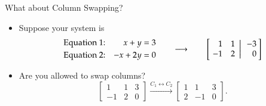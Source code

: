 \documentclass[10pt]{beamer}
\begin{document}
\begin{frame}{What about Column Swapping?}
\begin{itemize}
    \item Suppose your system is 
$$
        \begin{aligned}
        &\text{Equation 1:} & x + y  &= 3 \\
        &\text{Equation 2:} & -x + 2y  &= 0 
    \end{aligned}\qquad\longrightarrow\qquad
    \left[ \left.\negthickspace\begin{array}{rrrr}  1 &  1   \\
                                                   -1 & 2  \end{array}
    \right|\begin{array}{r} -3 \\ 0   \end{array}\negthickspace\right]
$$
    \item<2> Are you allowed to swap columns?
\[
\left[
\begin{array}{rr|r}
    1&1&3\\
    -1&2&0
\end{array}
\right]
\xrightarrow{C_1\leftrightarrow C_2}
\left[
\begin{array}{rr|r}
    1&1&3\\
    2&-1&0
\end{array}
\right].
\]
\end{itemize}

\end{frame}
\end{document}
